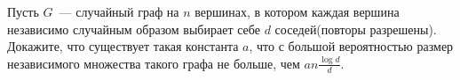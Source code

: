 Пусть $G$~--- случайный граф на $n$ вершинах, в котором каждая вершина независимо случайным образом выбирает себе $d$
соседей(повторы разрешены). Докажите, что существует такая константа $a$, что с большой вероятностью размер независимого
множества такого графа не больше, чем $a n \frac{\log{d}}{d}$. 
